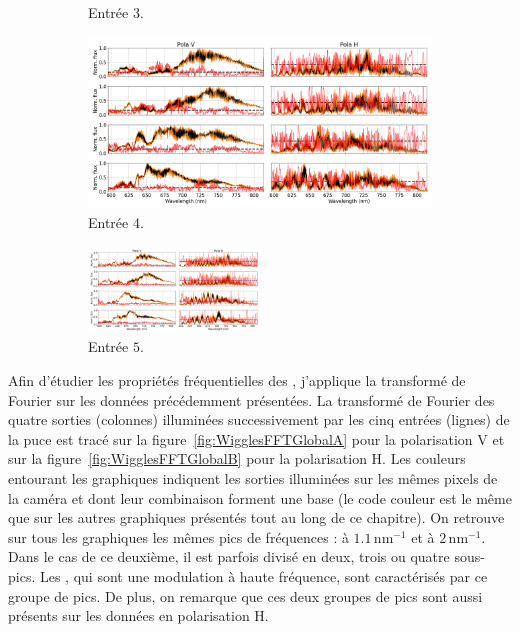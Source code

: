 \begin{figure}[ht!]
\begin{subfigure}{0.5\textwidth}
        \caption{Entrée $3$.}
    \end{subfigure}%
    \begin{subfigure}{0.5\textwidth}
        \centering
        \includegraphics[width=\textwidth]{Figure_Chap4/20220811_P2VM_01_Flat1_4_WigglesContrast.png}
        \caption{Entrée $4$.}
    \end{subfigure}
    \begin{subfigure}{\textwidth}
        \centering
        \includegraphics[width=0.5\textwidth]{Figure_Chap4/20220811_P2VM_01_Flat1_5_WigglesContrast.png}
        \caption{Entrée $5$.}
    \end{subfigure}
    \caption[]{}
    \label{fig:WigglesContrast}
\end{figure}

Afin d'étudier les propriétés fréquentielles des \wiggles, j'applique la transformé de Fourier sur les données précédemment présentées. La transformé de Fourier des quatre sorties (colonnes) illuminées successivement par les cinq entrées (lignes) de la puce est tracé sur la figure~\ref{fig:WigglesFFTGlobalA} pour la polarisation V et sur la figure~\ref{fig:WigglesFFTGlobalB} pour la polarisation H. Les couleurs entourant les graphiques indiquent les sorties illuminées sur les mêmes pixels de la caméra et dont leur combinaison forment une base (le code couleur est le même que sur les autres graphiques présentés tout au long de ce chapitre). On retrouve sur tous les graphiques les mêmes pics de fréquences : à $1.1 \,$nm$^{-1}$ et à $2 \,$nm$^{-1}$. Dans le cas de ce deuxième, il est parfois divisé en deux, trois ou quatre sous-pics. Les \wiggles, qui sont une modulation à haute fréquence, sont caractérisés par ce groupe de pics. De plus, on remarque que ces deux groupes de pics sont aussi présents sur les données en polarisation H.

